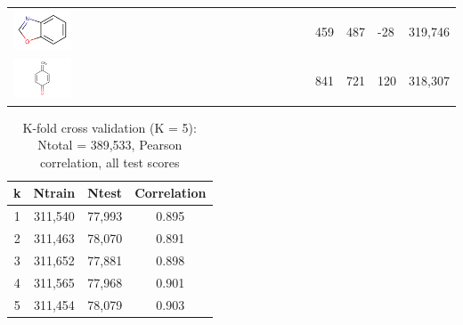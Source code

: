 \begin{longtable}
\begin{tabular}{ p{}p{}p{}p{}p{} }
\includegraphics[align=c,width=0.2\textwidth]{data/badapple/scaf_14.png} & 459 & 487 & -28 & 319,746 \\
\includegraphics[align=c,width=0.2\textwidth]{data/badapple/scaf_15.png} & 841 & 721 & 120 & 318,307 \\
\hline
\end{tabular}
\label{table:ba_cmp_retro}
\end{longtable}


\begin{table}
\caption{K-fold cross validation (K = 5): Ntotal = 389,533, Pearson correlation, all test scores}
\begin{center}
\begin{tabular}{ |c|c|c|c| } 
\hline
\textbf{k} & \textbf{Ntrain} & \textbf{Ntest} & \textbf{Correlation} \\
\hline
1 & 311,540 & 77,993 & 0.895 \\
2 & 311,463 & 78,070 & 0.891 \\
3 & 311,652 & 77,881 & 0.898 \\
4 & 311,565 & 77,968 & 0.901 \\
5 & 311,454 & 78,079 & 0.903 \\
\hline
\end{tabular}
\end{center}
\label{table:ba_cmp_xval}
\end{table}


